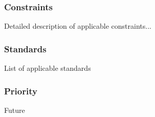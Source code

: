 \subsubsection{Constraints}
Detailed description of applicable constraints...
\subsubsection{Standards}
List of applicable standards
\subsubsection{Priority}
Future
